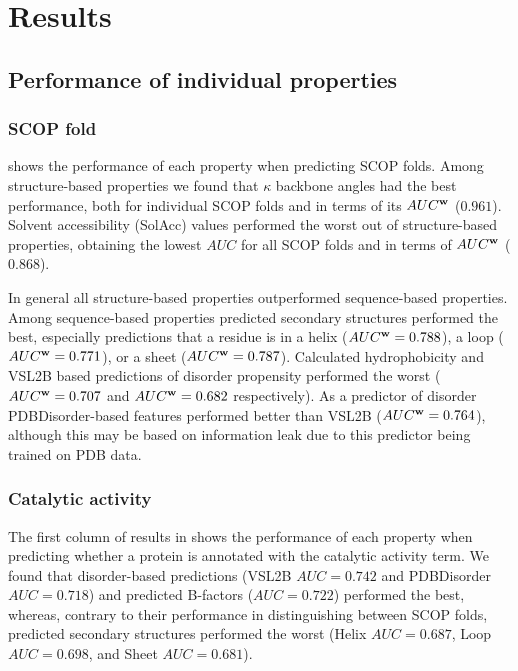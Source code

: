 \section{Results}

\subsection{Performance of individual properties}
\subsubsection{SCOP fold}

 shows the performance of each property when predicting SCOP folds.  Among structure-based properties we found that $\kappa$ backbone angles had the best performance, both for individual SCOP folds and in terms of its $AUC^{\bf{w}}$ ($0.961$).  Solvent accessibility (SolAcc) values performed the worst out of structure-based properties, obtaining the lowest $AUC$ for all SCOP folds and in terms of $AUC^{\bf{w}}$ ($0.868$). 

In general all structure-based properties outperformed sequence-based properties.  Among sequence-based properties predicted secondary structures performed the best, especially predictions that a residue is in a helix ($AUC^{\bf{w}}=0.788$), a loop ($AUC^{\bf{w}}=0.771$), or a sheet ($AUC^{\bf{w}}=0.787$).  Calculated hydrophobicity and VSL2B based predictions of disorder propensity performed the worst ($AUC^{\bf{w}}=0.707$ and $AUC^{\bf{w}}=0.682$ respectively).  As a predictor of disorder PDBDisorder-based features performed better than VSL2B ($AUC^{\bf{w}}=0.764$), although this may be based on information leak due to this predictor being trained on PDB data.



\subsubsection{Catalytic activity}
The first column of results in  shows the performance of each property when predicting whether a protein is annotated with the catalytic activity term.  We found that disorder-based predictions (VSL2B  $AUC=0.742$ and PDBDisorder $AUC=0.718$) and predicted B-factors ($AUC=0.722$) performed the best, whereas, contrary to their performance in distinguishing between SCOP folds, predicted secondary structures performed the worst (Helix $AUC=0.687$, Loop $AUC=0.698$, and Sheet $AUC=0.681$).

